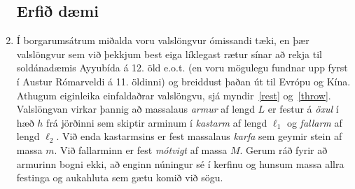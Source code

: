 \ifdefined \wholebook \else\documentclass[oneside]{book}\usepackage{EdlBook}\graphicspath{{figures/}}
\begin{document}
\begin{enumerate}[label = \textbf{Dæmi \thechapter.\arabic*.}]
\newpage


\subsection*{Erfið dæmi}


\item Í borgarumsátrum miðalda voru valslöngvur ómissandi tæki, en þær valslöngvur sem við þekkjum best eiga líklegast rætur sínar að rekja til soldánadæmis Ayyubída á 12. öld e.o.t. (en voru mögulegu fundnar upp fyrst í Austur Rómarveldi á 11. öldinni) og breiddust þaðan út til Evrópu og Kína.
Athugum eiginleika einfaldaðrar valslöngvu, sjá myndir~\ref{rest} og~\ref{throw}.
Valslöngvan virkar þannig að massalaus \textit{armur} af lengd \(L\) er festur á \textit{öxul} í hæð \(h\) frá jörðinni sem skiptir arminum í \textit{kastarm} af lengd \(\ell_1\) og \textit{fallarm} af lengd \(\ell_2\).
Við enda kastarmsins er fest massalaus \textit{karfa} sem geymir stein af massa \(m\).
Við fallarminn er fest \textit{mótvigt} af massa \(M\).
Gerum ráð fyrir að armurinn bogni ekki, að enginn núningur sé í kerfinu og hunsum massa allra festinga og aukahluta sem gætu komið við sögu.


\end{enumerate}
\end{document}
